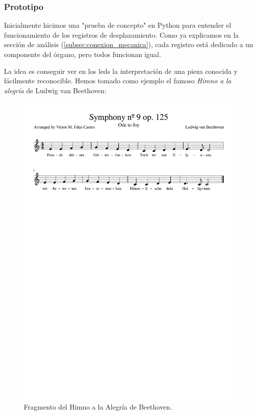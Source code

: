 \subsubsection{Prototipo}

Inicialmente hicimos una "prueba de concepto" en Python para entender el funcionamiento de los registros de desplazamiento. Como ya explicamos en la sección de análisis (\ref{subsec:conexion_mecanica}), cada registro está dedicado a un componente del órgano, pero todos funcionan igual.

La idea es conseguir ver en los \acrshort{led}s la interpretación de una pieza conocida y fácilmente reconocible. Hemos tomado como ejemplo el famoso \textit{Himno a la alegría} de Ludwig van Beethoven:

\smallskip

\begin{figure}[H]
	\noindent \begin{centering}
		\includegraphics[clip=true,trim=20 580 20 30,width=\linewidth*3/4]{capitulo5/beethoven_1voz}
		\par\end{centering}
	\smallskip
	\caption{\label{fig:beethoven_1voz} Fragmento del Himno a la Alegría de Beethoven.}
\end{figure}

